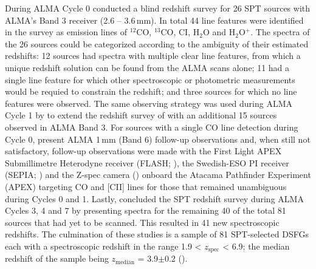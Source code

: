 During ALMA Cycle 0 \citealt{Weiss_2013} conducted a blind redshift survey for 26 SPT sources with ALMA's Band 3 receiver (2.6 -- 3.6\,mm). In total 44 line features were identified in the survey as emission lines of $^{12}$CO, $^{13}$CO, CI, H$_2$O and H$_2$O$^+$. The spectra of the 26 sources could be categorized according to the ambiguity of their estimated redshifts: 12 sources had spectra with multiple clear line features, from which a unique redshift solution can be found from the ALMA scans alone; 11 had a single line feature for which other spectroscopic or photometric measurements would be requied to constrain the redshift; and three sources for which no line features were observed. The same observing strategy was used during ALMA Cycle 1 by \citealt{Strandet_2016} to extend the redshift survey of \citealt{Weiss_2013} with an additional 15 sources observed in ALMA Band 3. For sources with a single CO line detection during Cycle 0, \citealt{Strandet_2016} present ALMA 1\,mm (Band 6) follow-up observations and, when still not satisfactory, follow-up observations were made with the First Light APEX Submillimetre Heterodyne receiver (FLASH; \citealt{Heyminck_2006}), the Swedish-ESO PI receiver (SEPIA; \citealt{Billade_2012}) and the Z-spec camera (\citealt{Naylor_2003}) onboard the Atacama Pathfinder Experiment (APEX) targeting CO and [CII] lines for those that remained unambiguous during Cycles 0 and 1. Lastly, \citealt{Reuter_2020} concluded the SPT redshift survey during ALMA Cycles 3, 4 and 7 by presenting spectra for the remaining 40 of the total 81 sources that had yet to be scanned. This resulted in 41 new spectroscopic redshifts. The culmination of these studies is a sample of 81 SPT-selected DSFGs  each with a spectroscopic redshift in the range 1.9 < $z_{\textrm{spec}}$ < 6.9; the median redshift of the sample being $z_{\textrm{median}}$ = 3.9$\pm$0.2 (\citealt{Reuter_2020}).

